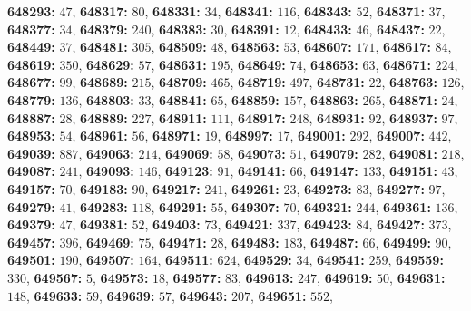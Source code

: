 \textsf{\bfseries 648293:} $47$, \textsf{\bfseries 648317:} $80$, \textsf{\bfseries 648331:} $34$, \textsf{\bfseries 648341:} $116$, \textsf{\bfseries 648343:} $52$, \textsf{\bfseries 648371:} $37$, \textsf{\bfseries 648377:} $34$, \textsf{\bfseries 648379:} $240$, \textsf{\bfseries 648383:} $30$, \textsf{\bfseries 648391:} $12$, \textsf{\bfseries 648433:} $46$, \textsf{\bfseries 648437:} $22$, \textsf{\bfseries 648449:} $37$, \textsf{\bfseries 648481:} $305$, \textsf{\bfseries 648509:} $48$, \textsf{\bfseries 648563:} $53$, \textsf{\bfseries 648607:} $171$, \textsf{\bfseries 648617:} $84$, \textsf{\bfseries 648619:} $350$, \textsf{\bfseries 648629:} $57$, \textsf{\bfseries 648631:} $195$, \textsf{\bfseries 648649:} $74$, \textsf{\bfseries 648653:} $63$, \textsf{\bfseries 648671:} $224$, \textsf{\bfseries 648677:} $99$, \textsf{\bfseries 648689:} $215$, \textsf{\bfseries 648709:} $465$, \textsf{\bfseries 648719:} $497$, \textsf{\bfseries 648731:} $22$, \textsf{\bfseries 648763:} $126$, \textsf{\bfseries 648779:} $136$, \textsf{\bfseries 648803:} $33$, \textsf{\bfseries 648841:} $65$, \textsf{\bfseries 648859:} $157$, \textsf{\bfseries 648863:} $265$, \textsf{\bfseries 648871:} $24$, \textsf{\bfseries 648887:} $28$, \textsf{\bfseries 648889:} $227$, \textsf{\bfseries 648911:} $111$, \textsf{\bfseries 648917:} $248$, \textsf{\bfseries 648931:} $92$, \textsf{\bfseries 648937:} $97$, \textsf{\bfseries 648953:} $54$, \textsf{\bfseries 648961:} $56$, \textsf{\bfseries 648971:} $19$, \textsf{\bfseries 648997:} $17$, \textsf{\bfseries 649001:} $292$, \textsf{\bfseries 649007:} $442$, \textsf{\bfseries 649039:} $887$, \textsf{\bfseries 649063:} $214$, \textsf{\bfseries 649069:} $58$, \textsf{\bfseries 649073:} $51$, \textsf{\bfseries 649079:} $282$, \textsf{\bfseries 649081:} $218$, \textsf{\bfseries 649087:} $241$, \textsf{\bfseries 649093:} $146$, \textsf{\bfseries 649123:} $91$, \textsf{\bfseries 649141:} $66$, \textsf{\bfseries 649147:} $133$, \textsf{\bfseries 649151:} $43$, \textsf{\bfseries 649157:} $70$, \textsf{\bfseries 649183:} $90$, \textsf{\bfseries 649217:} $241$, \textsf{\bfseries 649261:} $23$, \textsf{\bfseries 649273:} $83$, \textsf{\bfseries 649277:} $97$, \textsf{\bfseries 649279:} $41$, \textsf{\bfseries 649283:} $118$, \textsf{\bfseries 649291:} $55$, \textsf{\bfseries 649307:} $70$, \textsf{\bfseries 649321:} $244$, \textsf{\bfseries 649361:} $136$, \textsf{\bfseries 649379:} $47$, \textsf{\bfseries 649381:} $52$, \textsf{\bfseries 649403:} $73$, \textsf{\bfseries 649421:} $337$, \textsf{\bfseries 649423:} $84$, \textsf{\bfseries 649427:} $373$, \textsf{\bfseries 649457:} $396$, \textsf{\bfseries 649469:} $75$, \textsf{\bfseries 649471:} $28$, \textsf{\bfseries 649483:} $183$, \textsf{\bfseries 649487:} $66$, \textsf{\bfseries 649499:} $90$, \textsf{\bfseries 649501:} $190$, \textsf{\bfseries 649507:} $164$, \textsf{\bfseries 649511:} $624$, \textsf{\bfseries 649529:} $34$, \textsf{\bfseries 649541:} $259$, \textsf{\bfseries 649559:} $330$, \textsf{\bfseries 649567:} $5$, \textsf{\bfseries 649573:} $18$, \textsf{\bfseries 649577:} $83$, \textsf{\bfseries 649613:} $247$, \textsf{\bfseries 649619:} $50$, \textsf{\bfseries 649631:} $148$, \textsf{\bfseries 649633:} $59$, \textsf{\bfseries 649639:} $57$, \textsf{\bfseries 649643:} $207$, \textsf{\bfseries 649651:} $552$, 
